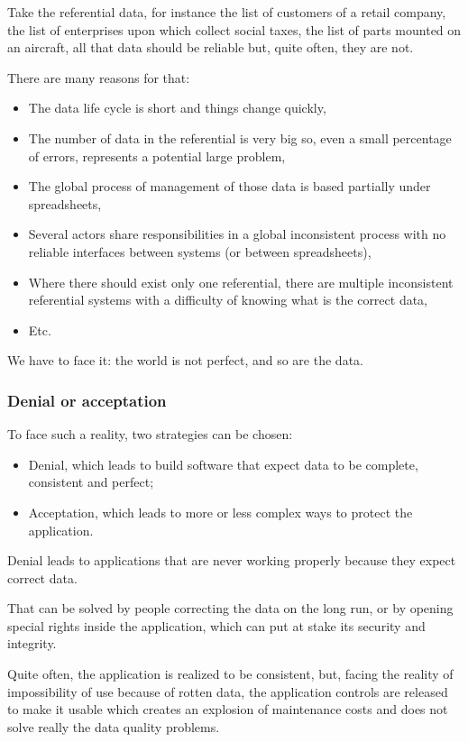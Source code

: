 \documentclass[]{article}
\begin{document}
Take the referential data, for instance the list of customers of a retail company, the list of enterprises upon which collect social taxes, the list of parts mounted on an aircraft, all that data should be reliable but, quite often, they are not.

There are many reasons for that:

\begin{itemize}
\item The data life cycle is short and things change quickly,
\item The number of data in the referential is very big so, even a small percentage of errors, represents a potential large problem,
\item The global process of management of those data is based partially under spreadsheets,
\item Several actors share responsibilities in a global inconsistent process with no reliable interfaces between systems (or between spreadsheets),
\item Where there should exist only one referential, there are multiple inconsistent referential systems with a difficulty of knowing what is the correct data,
\item Etc.
\end{itemize}

We have to face it: the world is not perfect, and so are the data.

\subsubsection{Denial or acceptation}

To face such a reality, two strategies can be chosen:

\begin{itemize}
\item Denial, which leads to build software that expect data to be complete, consistent and perfect;
\item Acceptation, which leads to more or less complex ways to protect the application.
\end{itemize}

Denial leads to applications that are never working properly because they expect correct data.

That can be solved by people correcting the data on the long run, or by opening special rights inside the application, which can put at stake its security and integrity.

Quite often, the application is realized to be consistent, but, facing the reality of impossibility of use because of rotten data, the application controls are released to make it usable which creates an explosion of maintenance costs and does not solve really the data quality problems.
\end{document}
